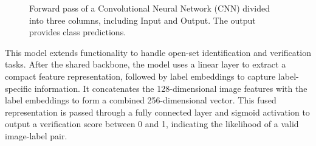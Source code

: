 \begin{figure}[h!]
    \caption{Forward pass of a Convolutional Neural Network (CNN) divided into three columns, including Input and Output. The output provides class predictions.}
    \label{fig:model-3-columns-final-with-output}
\end{figure}

This model extends functionality to handle open-set identification and verification tasks. After the shared backbone, the model uses a linear layer to extract a compact feature representation, followed by label embeddings to capture label-specific information. It concatenates the 128-dimensional image features with the label embeddings to form a combined 256-dimensional vector. This fused representation is passed through a fully connected layer and sigmoid activation to output a verification score between 0 and 1, indicating the likelihood of a valid image-label pair.

